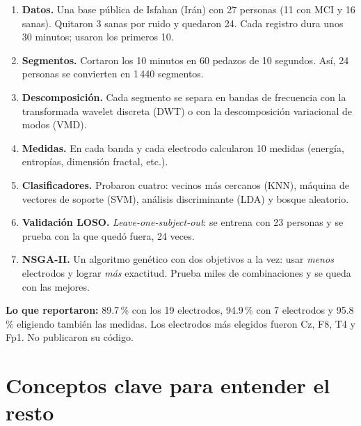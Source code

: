 \documentclass[11pt,letterpaper]{article}
\begin{document}
\begin{enumerate}[itemsep=2pt]
\item \textbf{Datos.} Una base pública de Isfahan (Irán) con 27 personas (11 con MCI y 16 sanas). Quitaron 3 sanas por ruido y quedaron 24. Cada registro dura unos 30 minutos; usaron los primeros 10.
\item \textbf{Segmentos.} Cortaron los 10 minutos en 60 pedazos de 10 segundos. Así, 24 personas se convierten en 1\,440 segmentos.
\item \textbf{Descomposición.} Cada segmento se separa en bandas de frecuencia con la transformada wavelet discreta (DWT) o con la descomposición variacional de modos (VMD).
\item \textbf{Medidas.} En cada banda y cada electrodo calcularon 10 medidas (energía, entropías, dimensión fractal, etc.).
\item \textbf{Clasificadores.} Probaron cuatro: vecinos más cercanos (KNN), máquina de vectores de soporte (SVM), análisis discriminante (LDA) y bosque aleatorio.
\item \textbf{Validación LOSO.} \emph{Leave-one-subject-out}: se entrena con 23 personas y se prueba con la que quedó fuera, 24 veces.
\item \textbf{NSGA-II.} Un algoritmo genético con dos objetivos a la vez: usar \emph{menos} electrodos y lograr \emph{más} exactitud. Prueba miles de combinaciones y se queda con las mejores.
\end{enumerate}

\textbf{Lo que reportaron:} 89.7\,\% con los 19 electrodos, 94.9\,\% con 7 electrodos y 95.8\,\% eligiendo también las medidas. Los electrodos más elegidos fueron Cz, F8, T4 y Fp1. No publicaron su código.

\section{Conceptos clave para entender el resto}
\end{document}
